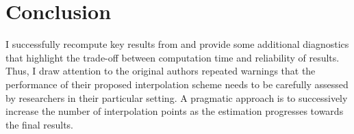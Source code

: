 \section{Conclusion}\label{Conclusion}
I successfully recompute key results from \citet{Keane.1994} and provide some additional diagnostics that highlight the trade-off between computation time and reliability of results. Thus, I draw attention to the original authors repeated warnings that the performance of their proposed interpolation scheme needs to be carefully assessed by researchers in their particular setting. A pragmatic approach is to successively increase the number of interpolation points as the estimation progresses towards the final results.
